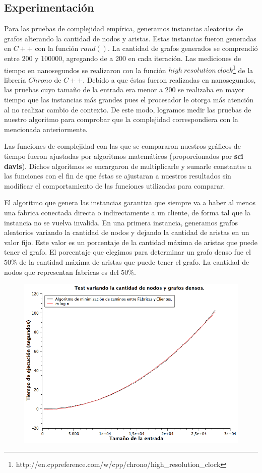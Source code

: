 \subsection{Experimentación}
Para las pruebas de complejidad empírica, generamos instancias aleatorias de grafos alterando la cantidad de nodos y aristas. Estas instancias fueron generadas en $C++$ con la función $rand()$. La cantidad de grafos generados se comprendió entre 200 y 100000, agregando de a 200 en cada iteración. Las mediciones de tiempo en nanosegundos se realizaron con la función $high\ resolution\ clock$\footnote{http://en.cppreference.com/w/cpp/chrono/high\_resolution\_clock} de la librería $Chrono$ de $C++$. Debido a que éstas fueron realizadas en nanosegundos, las pruebas cuyo tamaño de la entrada era menor a 200 se realizaba en mayor tiempo que las instancias más grandes pues el procesador le otorga más atención al no realizar cambio de contexto. De este modo, logramos medir las pruebas de nuestro algoritmo para comprobar que la complejidad correspondiera con la mencionada anteriormente.

Las funciones de complejidad con las que se compararon nuestros gráficos de tiempo fueron ajustadas por algoritmos matemáticos (proporcionados por \textbf{sci davis}). Dichos algoritmos se encargaron de multiplicarle y sumarle constantes a las funciones con el fin de que éstas se ajustaran a nuestros resultados sin modificar el comportamiento de las funciones utilizadas para comparar.

El algoritmo que genera las instancias garantiza que siempre va a haber al menos una fabrica conectada directa o indirectamente a un cliente, de forma tal que la instancia no se vuelva invalida.
\newpage
En una primera instancia, generamos grafos aleatorios variando la cantidad de nodos y dejando la cantidad de aristas en un valor fijo. Este valor es un porcentaje de la cantidad máxima de aristas que puede tener el grafo. El porcentaje que elegimos para determinar un grafo denso fue el $50\%$ de la cantidad máxima de aristas que puede tener el grafo. La cantidad de nodos que representan fabricas es del $50\%$.

\begin{figure}[H]
	\includegraphics[width=350pt]{../tests/ej3/EJ3-nodo-var-denso.png}
\end{figure}

